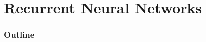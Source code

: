 \renewcommand{\thispart}{7 }
\renewcommand{\thispartname}{Recurrent Neural Networks}

\part{\thispartname}



\section{Outline}

